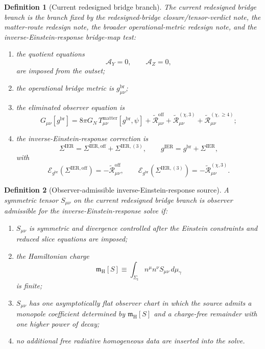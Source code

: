 \documentclass[11pt]{article}
\newcommand{\ReBridge}{g^{\mathrm{br}}}
\newcommand{\OpMetricIER}{g^{\mathrm{IER}}}
\newcommand{\SigmaIER}{\Sigma^{\mathrm{IER}}}
\newcommand{\SigmaOff}{\Sigma^{\mathrm{IER,off}}}
\newcommand{\SigmaLongThree}{\Sigma^{\mathrm{IER},(3)}}
\newcommand{\ReOff}{\widetilde{\mathcal R}_{\mu\nu}^{\mathrm{off}}}
\newcommand{\ReLongThree}{\widetilde{\mathcal R}_{\mu\nu}^{(\chi,3)}}
\newcommand{\ReLongFour}{\widetilde{\mathcal R}_{\mu\nu}^{(\chi,\ge 4)}}
\newcommand{\EinLin}{\mathcal E_{\ReBridge}}
\newcommand{\HamCharge}{\mathfrak m_{\mathrm H}}
\newcommand{\AY}{\mathcal A_Y}
\newcommand{\AZ}{\mathcal A_Z}
\newtheorem{definition}{Definition}
\begin{document}
\begin{definition}[Current redesigned bridge branch]
\label{def:branch}
The \emph{current redesigned bridge branch} is the branch fixed by the redesigned-bridge closure/tensor-verdict note, the matter-route redesign note, the broader operational-metric redesign note, and the inverse-Einstein-response bridge-map test:
\begin{enumerate}
    \item the quotient equations
    \begin{equation}
    \AY=0,
    \qquad
    \AZ=0,
    \label{eq:AYAZ}
    \end{equation}
    are imposed from the outset;
    \item the operational bridge metric is \(\ReBridge_{\mu\nu}\);
    \item the eliminated observer equation is
    \begin{equation}
    G_{\mu\nu}[\ReBridge]
    =
    8\pi G_N\,T_{\mu\nu}^{\mathrm{matter}}[\ReBridge,\psi]
    +\ReOff+\ReLongThree+\ReLongFour;
    \label{eq:oldobs}
    \end{equation}
    \item the inverse-Einstein-response correction is
    \begin{equation}
    \SigmaIER=\SigmaOff+\SigmaLongThree,
    \qquad
    \OpMetricIER=\ReBridge+\SigmaIER,
    \label{eq:iermetric}
    \end{equation}
    with
    \begin{equation}
    \EinLin(\SigmaOff)=-\ReOff,
    \qquad
    \EinLin(\SigmaLongThree)=-\ReLongThree.
    \label{eq:solveeqs}
    \end{equation}
\end{enumerate}
\end{definition}

\begin{definition}[Observer-admissible inverse-Einstein-response source]
\label{def:source}
A symmetric tensor \(S_{\mu\nu}\) on the current redesigned bridge branch is \emph{observer admissible for the inverse-Einstein-response solve} if:
\begin{enumerate}
    \item \(S_{\mu\nu}\) is symmetric and divergence controlled after the Einstein constraints and reduced slice equations are imposed;
    \item the Hamiltonian charge
    \begin{equation}
    \HamCharge[S]
    \equiv
    \int_{\Sigma_t} n^\mu n^\nu S_{\mu\nu}\,d\mu_\gamma
    \label{eq:charge}
    \end{equation}
    is finite;
    \item \(S_{\mu\nu}\) has one asymptotically flat observer chart in which the source admits a monopole coefficient determined by \(\HamCharge[S]\) and a charge-free remainder with one higher power of decay;
    \item no additional free radiative homogeneous data are inserted into the solve.
\end{enumerate}
\end{definition}
\end{document}
